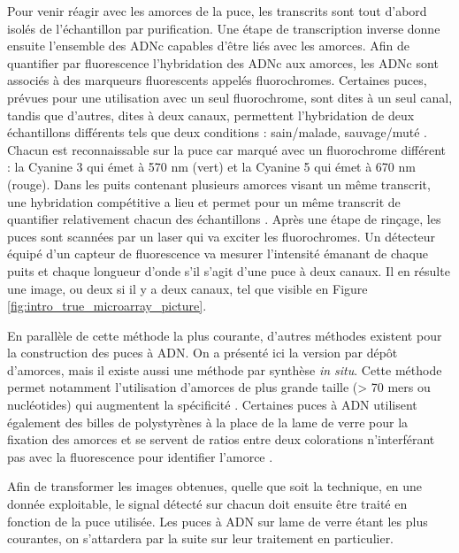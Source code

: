 Pour venir réagir avec les amorces de la puce, les transcrits sont tout d'abord isolés de l'échantillon par purification. Une étape de transcription inverse donne ensuite l'ensemble des ADNc capables d'être liés avec les amorces. Afin de quantifier par fluorescence l'hybridation des ADNc aux amorces, les ADNc sont associés à des marqueurs fluorescents appelés fluorochromes. Certaines puces, prévues pour une utilisation avec un seul fluorochrome, sont dites à un seul canal, tandis que d'autres, dites à deux canaux, permettent l'hybridation de deux échantillons différents tels que deux conditions : sain/malade, sauvage/muté \cite{Bumgarner2013Jan}. Chacun est reconnaissable sur la puce car marqué avec un fluorochrome différent : la Cyanine 3 qui émet à  570 nm (vert) et la Cyanine 5 qui émet à 670 nm (rouge). Dans les puits contenant plusieurs amorces visant un même transcrit, une hybridation compétitive a lieu et permet pour un même transcrit de quantifier relativement chacun des échantillons \cite{Koltai2008Apr}. Après une étape de rinçage, les puces sont scannées par un laser qui va exciter les fluorochromes. Un détecteur équipé d'un capteur de fluorescence va mesurer l'intensité émanant de chaque puits et chaque longueur d'onde s'il s'agit d'une puce à deux canaux. Il en résulte une image, ou deux si il y a deux canaux, tel que visible en Figure \ref{fig:intro_true_microarray_picture}.





En parallèle de cette méthode la plus courante, d'autres méthodes existent pour la construction des puces à ADN. On a présenté ici la version par dépôt d'amorces, mais il existe aussi une méthode par synthèse \textit{in situ}. Cette méthode permet notamment l'utilisation d'amorces de plus grande taille (> 70 mers ou nucléotides) qui augmentent la spécificité \cite{Liu2010}. Certaines puces à ADN utilisent également des billes de polystyrènes à la place de la lame de verre pour la fixation des amorces et se servent de ratios entre deux colorations n'interférant pas avec la fluorescence pour identifier l'amorce \cite{Nesterov-Mueller2014Oct}. 

Afin de transformer les images obtenues, quelle que soit la technique, en une donnée exploitable, le signal détecté sur chacun doit ensuite être traité en fonction de la puce utilisée. Les puces à ADN sur lame de verre étant les plus courantes, on s'attardera par la suite sur leur traitement en particulier.


